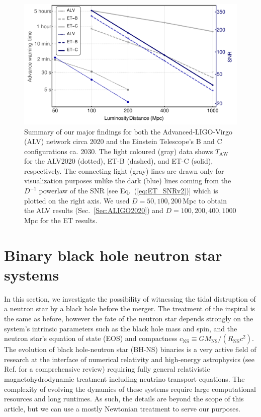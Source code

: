 \documentclass[prd,amsmath,amssymb,aps,floats,amsfonts,notitlepage,superscriptaddress,eqsecnum,nofootinbib,10pt]{revtex4-1}
\begin{document}
\begin{figure}[ht!]
\includegraphics[width=\linewidth]{../Figures/Main_results.pdf}
\caption{Summary of our major findings for both the Advanced-LIGO-Virgo (ALV) network circa 2020 and the Einstein Telescope's B and C configurations
ca. 2030. The light coloured (gray) data shows $T_\text{AW}$ for the ALV2020 (dotted), ET-B (dashed), and ET-C (solid), respectively.
The connecting light (gray) lines are drawn only for visualization purposes unlike the dark (blue) lines coming from the $D^{-1}$ powerlaw of the SNR [see Eq.~(\ref{eq:ET_SNRv2})] which is plotted on the right axis. 
We used $D=50,100,200\,$Mpc to obtain the ALV results (Sec.~\ref{Sec:ALIGO2020}) and $D=100,200,400,1000\,$Mpc for the ET results.}\label{fig:summary}
\end{figure}
%
%
%
%
%
\section{Binary black hole neutron star systems}\label{sec:BH_NS}
In this section, we investigate the possibility of witnessing the tidal distruption of a neutron star by a black hole before the merger.
The treatment of the inspiral is the same as before, however the fate of the neutron star depends strongly on the system's intrinsic parameters
such as the black hole mass and spin, and the neutron star's equation of state (EOS) and compactness $c_\text{NS}\equiv G M_\text{NS}/(R_\text{NS}c^2)$. 
The evolution of black hole-neutron star (BH-NS) binaries is a very active field of research at the interface of numerical relativity and high-energy astrophysics
(see Ref. \cite{Shibata:2011jka} for a comprehensive review) requiring fully general relativistic magnetohydrodynamic treatment including neutrino transport equations.
The complexity of evolving the dynamics of these systems require large computational resources and long runtimes.
As such, the details are beyond the scope of this article, but we can use a mostly Newtonian treatment to serve our purposes. %
\end{document}
